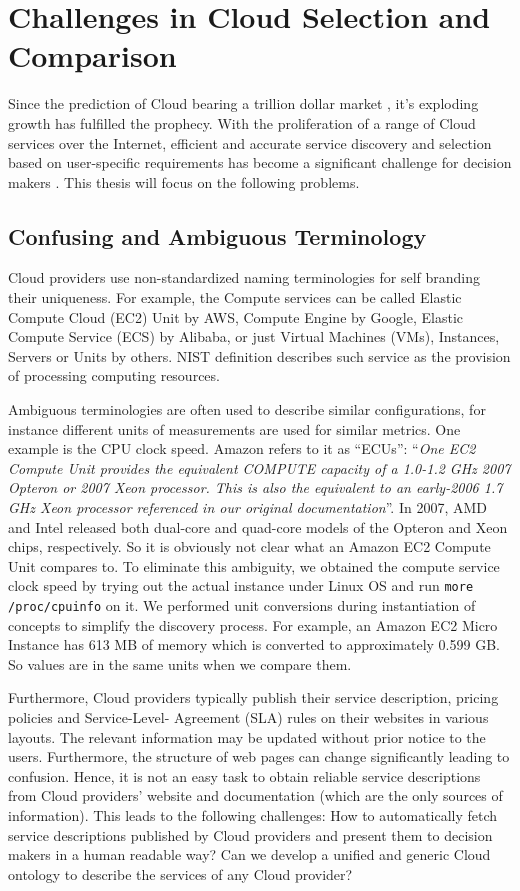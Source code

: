 \section{Challenges in Cloud Selection and Comparison}
\label{sec:research_problem}
Since the prediction of Cloud bearing a trillion dollar market \cite{Market-OrientedCloudComputing}, it's exploding growth has fulfilled the prophecy.
With the proliferation of a range of Cloud services over the
Internet, efficient and accurate service discovery and selection
based on user-specific requirements has become a significant challenge for decision makers \cite{SMICloud}. This thesis will focus on the following problems.

\subsection{Confusing and Ambiguous Terminology}
\label{subsec:Non-standardizedAmbiguousTerminology}
Cloud providers use non-standardized naming terminologies for self branding their uniqueness. 
For example, the Compute services 
can be called Elastic Compute Cloud (EC2) Unit by AWS, Compute Engine by Google, 
Elastic Compute Service (ECS) by Alibaba, or just Virtual Machines (VMs), Instances, Servers or Units by others. NIST definition describes such service as the provision of processing computing resources.

Ambiguous terminologies are often used to describe similar configurations,
for instance different units of measurements are used for similar metrics.
One example is the CPU clock speed. Amazon refers to it as “ECUs”\cite{AmazonEC2}:
“\textit{One EC2 Compute Unit provides the equivalent COMPUTE capacity of a 1.0-1.2 GHz 2007 Opteron or 2007 Xeon processor. This is also the equivalent to an early-2006 1.7 GHz Xeon processor referenced in our original documentation}”.
In 2007, AMD and Intel released both dual-core and quad-core models of the Opteron and Xeon chips, respectively. So it is obviously not clear what an Amazon EC2 Compute Unit compares to. To eliminate this ambiguity, we obtained the compute service clock speed by trying out the actual instance under Linux OS and run \texttt{more /proc/cpuinfo} on it.
We performed unit conversions during instantiation of concepts to simplify the discovery process.
For example, an Amazon EC2 Micro Instance has 613 MB of memory which is converted to approximately 0.599 GB. So values are in the same units when we compare them. 

Furthermore, Cloud providers
typically publish their service description, pricing policies and Service-Level-
Agreement (SLA) rules on their websites in various layouts.
The relevant information may be updated without prior notice to the users.
Furthermore, the structure of web pages can change significantly leading to confusion.
Hence, it is not an easy task to obtain reliable service descriptions from Cloud
providers’ website and documentation (which are the only
sources of information). This leads to the following
challenges: 
How to automatically fetch service descriptions
published by Cloud providers and present them to decision
makers in a human readable way? Can we develop a unified
and generic Cloud ontology to describe the services of any
Cloud provider?

